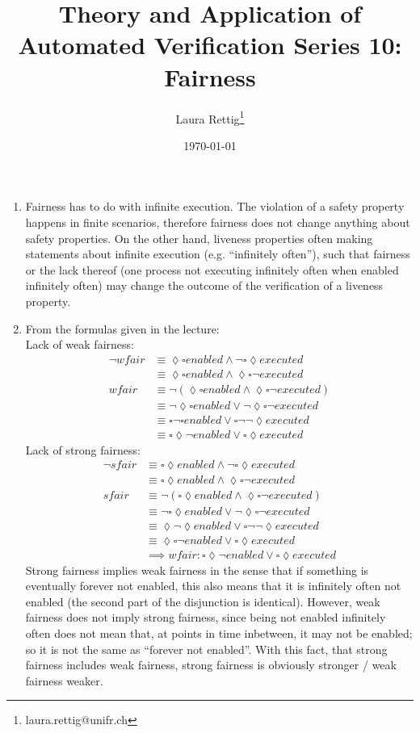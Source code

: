 \documentclass[11pt,a4paper]{article}
\title{
        Theory and Application of Automated Verification \linebreak
        \bf{Series 10: Fairness}
}
\author{
        Laura Rettig\footnote{laura.rettig@unifr.ch}
       }
\date{\normalsize \today}
\begin{document}

\maketitle

\begin{enumerate}
\item Fairness has to do with infinite execution. The violation of a safety property happens in finite scenarios, therefore fairness does not change anything about safety properties. On the other hand, liveness properties often making statements about infinite execution (e.g. ``infinitely often''), such that fairness or the lack thereof (one process not executing infinitely often when enabled infinitely often) may change the outcome of the verification of a liveness property.
\item From the formulas given in the lecture:
\\ Lack of weak fairness: 
\begin{align*}
\lnot wfair &\equiv \lozenge\square enabled\land\lnot\square\lozenge executed \\
	&\equiv \lozenge\square enabled\land\lozenge\square\lnot executed\\
wfair &\equiv \lnot(\lozenge\square enabled\land\lozenge\square\lnot executed)\\
	&\equiv \lnot\lozenge\square enabled \vee \lnot\lozenge\square\lnot executed \\
&\equiv \square\lnot\square enabled \vee \square\lnot\lnot\lozenge executed\\
	&\equiv \square\lozenge\lnot enabled \vee \square\lozenge executed
\end{align*}
Lack of strong fairness: 
\begin{align*}
\lnot sfair &\equiv \square\lozenge enabled \land \lnot\square\lozenge executed \\
	&\equiv \square\lozenge enabled \land \lozenge\square\lnot executed \\
sfair &\equiv \lnot(\square\lozenge enabled \land \lozenge\square\lnot executed) \\
	&\equiv \lnot\square\lozenge enabled \vee \lnot\lozenge\square\lnot executed \\
	&\equiv \lozenge\lnot\lozenge enabled \vee \square\lnot\lnot\lozenge executed \\
	&\equiv \lozenge\square\lnot enabled \vee \square\lozenge executed \\
	&\implies wfair: \square\lozenge\lnot enabled \vee \square\lozenge executed
\end{align*}
Strong fairness implies weak fairness in the sense that if something is eventually forever not enabled, this also means that it is infinitely often not enabled (the second part of the disjunction is identical). However, weak fairness does not imply strong fairness, since being not enabled infinitely often does not mean that, at points in time inbetween, it may not be enabled; so it is not the same as ``forever not enabled''. With this fact, that strong fairness includes weak fairness, strong fairness is obviously stronger / weak fairness weaker.
\end{enumerate}


\end{document}
